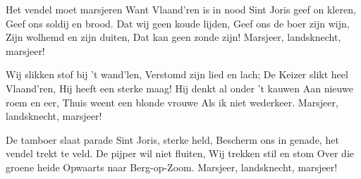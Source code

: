 \footnotemark [
ititle={Vendel, het}]


\beginverse
Het vendel moet marsjeren
Want Vlaand'ren is in nood
Sint Joris geef on kleren,
Geef ons soldij en brood.
Dat wij geen koude lijden,
Geef ons de boer zijn wijn,
Zijn wolhemd en zijn duiten,
Dat kan geen zonde zijn!
Marsjeer, landsknecht, marsjeer!
\endverse

\beginverse
Wij slikken stof bij 't wand'len,
Verstomd zijn lied en lach;
De Keizer slikt heel Vlaand'ren,
Hij heeft een sterke maag!
Hij denkt al onder 't kauwen
Aan nieuwe roem en eer,
Thuis weent een blonde vrouwe
Als ik niet wederkeer.
Marsjeer, landsknecht, marsjeer!
\endverse

\beginverse
De tamboer slaat parade
Sint Joris, sterke held,
Bescherm ons in genade,
het vendel trekt te veld.
De pijper wil niet fluiten,
Wij trekken stil en stom
Over die groene heide
Opwaarts naar Berg-op-Zoom.
Marsjeer, landsknecht, marsjeer!
\endverse
\endsong